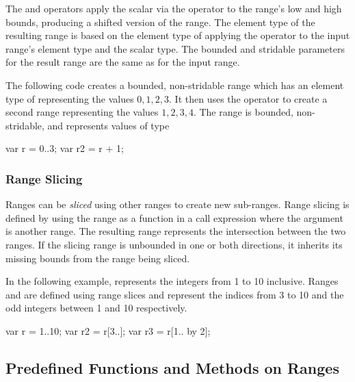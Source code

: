 The \chpl{+} and \chpl{-} operators apply the scalar via the operator
to the range's low and high bounds, producing a shifted version of the
range.  The element type of the resulting range is based on the
element type of applying the operator to the input range's element
type and the scalar type.  The bounded and stridable parameters for
the result range are the same as for the input range.

\begin{example}
The following code creates a bounded, non-stridable range 
which has an element type of  representing the values ${0,
  1, 2, 3}$.  It then uses the \chpl{+} operator to
create a second range  representing the values ${1, 2, 3,
  4}$.  The  range is bounded, non-stridable, and represents
values of type 
\begin{chapel}
var r = 0..3;
var r2 = r + 1;
\end{chapel}
\end{example}


\subsubsection{Range Slicing}
\label{Range_Slicing}

Ranges can be \emph{sliced} using other ranges to create new
sub-ranges.  Range slicing is defined by using the range as a function
in a call expression where the argument is another range.  The
resulting range represents the intersection between the two ranges.
If the slicing range is unbounded in one or both directions, it
inherits its missing bounds from the range being sliced.

\begin{example}
In the following example,  represents the integers from 1 to
10 inclusive.  Ranges  and  are defined using range
slices and represent the indices from 3 to 10 and the odd integers
between 1 and 10 respectively.
\begin{chapel}
var r = 1..10;
var r2 = r[3..];
var r3 = r[1.. by 2];
\end{chapel}
\end{example}

\subsection{Predefined Functions and Methods on Ranges}

